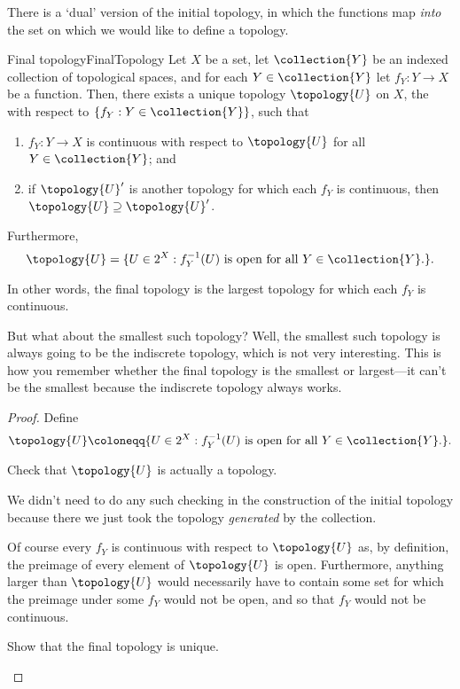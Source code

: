 There is a `dual' version of the initial topology, in which the functions map \emph{into} the set on which we would like to define a topology.
\begin{prp}{Final topology}{FinalTopology}
Let $X$ be a set, let $\collection{Y}$ be an indexed collection of topological spaces, and for each $Y\in \collection{Y}$ let $f_Y:Y\rightarrow X$ be a function.  Then, there exists a unique topology $\topology{U}$ on $X$, the  with respect to $\{ f_Y:Y\in \collection{Y}\}$, such that
\begin{enumerate}
\item $f_Y:Y\rightarrow X$ is continuous with respect to $\topology{U}$ for all $Y\in \collection{Y}$; and
\item if $\topology{U}'$ is another topology for which each $f_Y$ is continuous, then $\topology{U}\supseteq \topology{U}'$.
\end{enumerate}
Furthermore,
\begin{equation}\label{eqn3.4.27}
\topology{U}=\{ U\in 2^X:f_Y^{-1}(U)\text{ is open for all }Y\in \collection{Y}\text{.}\} .
\end{equation}
\begin{rmk}
In other words, the final topology is the largest topology for which each $f_Y$ is continuous.
\end{rmk}
\begin{rmk}
But what about the smallest such topology?  Well, the smallest such topology is always going to be the indiscrete topology, which is not very interesting.  This is how you remember whether the final topology is the smallest or largest---it can't be the smallest because the indiscrete topology always works.
\end{rmk}
\begin{proof}
Define
\begin{equation}\label{3.4.9}
\topology{U}\coloneqq \{ U\in 2^X:f_Y^{-1}(U)\text{ is open for all }Y\in \collection{Y}\text{.}\} .
\end{equation}
\begin{exr}[breakable=false]{}{}
Check that $\topology{U}$ is actually a topology.
\begin{rmk}
We didn't need to do any such checking in the construction of the initial topology because there we just took the topology \emph{generated} by the collection.
\end{rmk}
\end{exr}
Of course every $f_Y$ is continuous with respect to $\topology{U}$ as, by definition, the preimage of every element of $\topology{U}$ is open.  Furthermore, anything larger than $\topology{U}$ would necessarily have to contain some set for which the preimage under some $f_Y$ would not be open, and so that $f_Y$ would not be continuous.
\begin{exr}[breakable=false]{}{}
Show that the final topology is unique.
\end{exr}
\end{proof}
\end{prp}
